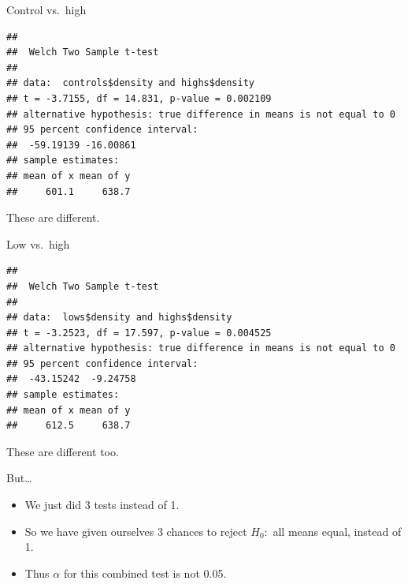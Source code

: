 \documentclass[
  ignorenonframetext,
]{beamer}
\newenvironment{Shaded}{\begin{snugshade}}{\end{snugshade}}
\newcommand{\KeywordTok}[1]{\textcolor[rgb]{0.13,0.29,0.53}{\textbf{#1}}}
\newcommand{\NormalTok}[1]{#1}
\newcommand{\OperatorTok}[1]{\textcolor[rgb]{0.81,0.36,0.00}{\textbf{#1}}}
\providecommand{\tightlist}{%
  \setlength{\itemsep}{0pt}\setlength{\parskip}{0pt}}
\begin{document}
\begin{frame}[fragile]{Control vs.~high}
\protect\hypertarget{control-vs.-high}{}

\begin{Shaded}
\end{Shaded}

\begin{verbatim}
## 
##  Welch Two Sample t-test
## 
## data:  controls$density and highs$density
## t = -3.7155, df = 14.831, p-value = 0.002109
## alternative hypothesis: true difference in means is not equal to 0
## 95 percent confidence interval:
##  -59.19139 -16.00861
## sample estimates:
## mean of x mean of y 
##     601.1     638.7
\end{verbatim}

These are different.

\end{frame}

\begin{frame}[fragile]{Low vs.~high}
\protect\hypertarget{low-vs.-high}{}

\begin{Shaded}
\end{Shaded}

\begin{verbatim}
## 
##  Welch Two Sample t-test
## 
## data:  lows$density and highs$density
## t = -3.2523, df = 17.597, p-value = 0.004525
## alternative hypothesis: true difference in means is not equal to 0
## 95 percent confidence interval:
##  -43.15242  -9.24758
## sample estimates:
## mean of x mean of y 
##     612.5     638.7
\end{verbatim}

These are different too.

\end{frame}

\begin{frame}{But\ldots{}}
\protect\hypertarget{but}{}

\begin{itemize}
\tightlist
\item
  We just did 3 tests instead of 1.
\item
  So we have given ourselves 3 chances to reject \(H_0:\) all means
  equal, instead of 1.
\item
  Thus \(\alpha\) for this combined test is not 0.05.
\end{itemize}

\end{frame}
\end{document}

